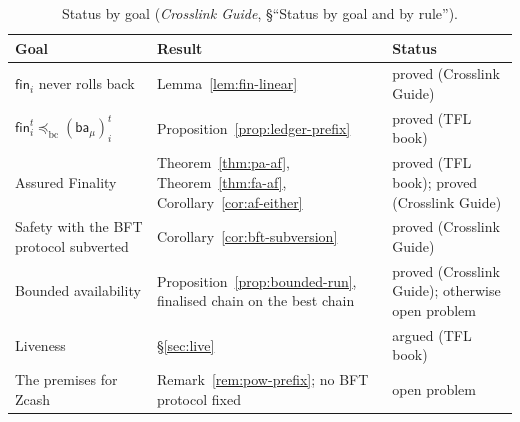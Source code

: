 \documentclass[11pt,a4paper]{article}
\theoremstyle{definition}
\newcommand{\bc}{\mathrm{bc}}
\newcommand{\preceqbc}{\preceq_{\bc}}
\newcommand{\fin}{\mathsf{fin}}
\newcommand{\ba}{\mathsf{ba}}
\begin{document}
\begin{table}[ht]
\caption{Status by goal (\emph{Crosslink Guide}, \S``Status by goal and by
rule'').}
\label{tab:status}
\begin{tabular}{@{}p{}p{}p{}@{}}
\toprule
Goal & Result & Status \\
\midrule
$\fin_i$ never rolls back & Lemma~\ref{lem:fin-linear} & proved (Crosslink
  Guide) \\
$\fin_i^t \preceqbc (\ba_\mu)_i^t$ & Proposition~\ref{prop:ledger-prefix} &
  proved (TFL book) \\
Assured Finality & Theorem~\ref{thm:pa-af}, Theorem~\ref{thm:fa-af},
  Corollary~\ref{cor:af-either} & proved (TFL book); proved (Crosslink
  Guide) \\
Safety with the BFT protocol subverted & Corollary~\ref{cor:bft-subversion} &
  proved (Crosslink Guide) \\
Bounded availability & Proposition~\ref{prop:bounded-run}, finalised chain
  on the best chain & proved (Crosslink Guide); otherwise open problem \\
Liveness & \S\ref{sec:live} & argued (TFL book) \\
The premises for Zcash & Remark~\ref{rem:pow-prefix}; no BFT protocol fixed
  & open problem \\
\bottomrule
\end{tabular}
\end{table}
\end{document}

